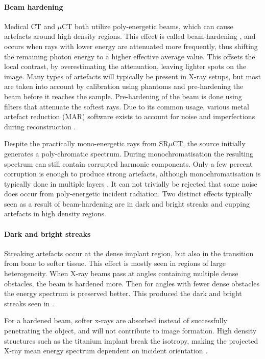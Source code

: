 \documentclass[pdflatex,sn-mathphys]{sn-jnl}%
\theoremstyle{thmstyleone}%
\theoremstyle{thmstyletwo}%
\theoremstyle{thmstylethree}%
\begin{document}
\paragraph{Beam hardening}
Medical CT and $\mu$CT both utilize poly-energetic beams, which can cause artefacts around high
density regions. This effect is called beam-hardening \citep{beam-hardening}, and occurs when rays
with lower energy are attenuated more frequently, thus shifting the remaining photon energy to a
higher effective average value. This offsets the local contrast, by overestimating the attenuation,
leaving lighter spots on the image. Many types of artefacts will typically be present in X-ray 
setups, but most are taken into account by calibration using phantoms and pre-hardening the beam
before it reaches the sample. Pre-hardening of the beam is done using filters that attenuate the
softest rays. Due to its common usage, various metal artefact reduction (MAR) software exists to
account for noise and imperfections during reconstruction \citep{mar1}\citep{mar2}.

Despite the practically mono-energetic rays from SR$\mu$CT, the source initially generates a
poly-chromatic spectrum. During monochromatisation the resulting spectrum can still contain
corrupted harmonic components. Only a few percent corruption is enough to produce strong artefacts,
although monochromatisation is typically done in multiple layers \citep{srnoise}.  It can not
trivially be rejected that some noise does occur from poly-energetic incident radiation.  Two
distinct effects typically seen as a result of beam-hardening are in dark and bright streaks and
cupping artefacts in high density regions.

\paragraph{Dark and bright streaks} Streaking artefacts occur at the dense implant region, but also
in the transition from bone to softer tissue. This effect is mostly seen in regions of large
heterogeneity. When X-ray beams pass at angles containing multiple dense obstacles, the beam is
hardened more. Then for angles with fewer dense obstacles the energy spectrum is preserved better.
This produced the dark and bright streaks seen in .

For a hardened beam, softer x-rays are absorbed instead of successfully penetrating the object, and
will not contribute to image formation. High density structures such as the titanium implant break
the isotropy, making the projected X-ray mean energy spectrum dependent on incident orientation
\citep{srnoise}.
\end{document}
